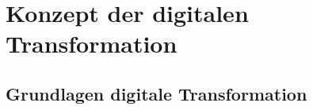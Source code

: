 \documentclass[12pt,a4paper]{article}
\begin{document}
\newpage
\section{Konzept der digitalen Transformation}

\vspace*{0.5cm}
\subsection{Grundlagen digitale Transformation} %
\end{document}
